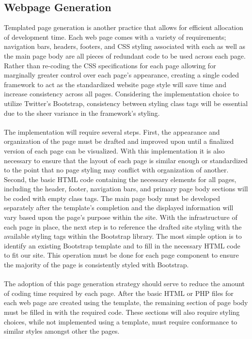 \documentclass[letterpaper,10pt, draftclsnofoot,onecolumn]{IEEEtran}
\begin{document}
{{\subsection[Templated page Generation]{\noindent\color{black}
Webpage Generation}
{\noindent\color{black}
Templated page generation is another practice that allows for efficient allocation of development time. 
Each web page comes with a variety of requirements; navigation bars, headers, footers, and CSS styling associated with each as well as the main page body are all pieces of redundant code to be used across each page.
Rather than re-coding the CSS specifications for each page allowing for marginally greater control over each page's appearance, creating a single coded framework to act as the standardized website page style will save time and increase consistency across all pages. 
Considering the implementation choice to utilize Twitter's Bootstrap, consistency between styling class tags will be essential due to the sheer variance in the framework's styling.
\\ \\
The implementation will require several steps. 
First, the appearance and organization of the page must be drafted and improved upon until a finalized version of each page can be visualized. 
With this implementation it is also necessary to ensure that the layout of each page is similar enough or standardized to the point that no page styling may conflict with organization of another.
Second, the basic HTML code containing the necessary elements for all pages, including the header, footer, navigation bars, and primary page body sections will be coded with empty class tags. 
The main page body must be developed separately after the template's completion and the displayed information will vary based upon the page’s purpose within the site. 
With the infrastructure of each page in place, the next step is to reference the drafted site styling with the available styling tags within the Bootstrap library. 
The most simple option is to identify an existing Bootstrap template and to fill in the necessary HTML code to fit our site. 
This operation must be done for each page component to ensure the majority of the page is consistently styled with Bootstrap.
\\ \\
The adoption of this page generation strategy should serve to reduce the amount of coding time required by each page. After the basic HTML or PHP files for each web page are created using the template, the remaining section of page body must be filled in with the required code. These sections will also require styling choices, while not implemented using a template, must require conformance to similar styles amongst other the pages. 
}}}
\end{document}
